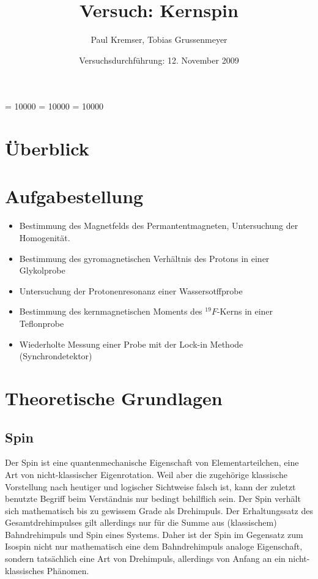 \documentclass[12pt]{article}
\newcommand{\changefont}[3]{
\fontfamily{#1} \fontseries{#2} \fontshape{#3} \selectfont}
\begin{document}
\clubpenalty = 10000
\widowpenalty = 10000 
\displaywidowpenalty = 10000

\onehalfspacing
\changefont{ptm}{m}{n} 

\begin{titlepage}
\author{Paul Kremser, Tobias Grussenmeyer}
\title{Versuch: Kernspin}
\date{Versuchsdurchführung: 12. November 2009} 
\maketitle
\thispagestyle{empty}
\end{titlepage}


\tableofcontents
\thispagestyle{empty}
\newpage
{}
\section{Überblick}

\section{Aufgabestellung}
\begin{itemize}
 \item Bestimmung des Magnetfelds des Permantentmagneten, Untersuchung der Homogenität.
 \item Bestimmung des gyromagnetischen Verhältnis des Protons in einer Glykolprobe
 \item Untersuchung der Protonenresonanz einer Wassersotffprobe
 \item Bestimmung des kernmagnetischen Moments des $^{19}F$-Kerns in einer Teflonprobe
 \item Wiederholte Messung einer Probe mit der Lock-in Methode (Synchrondetektor)
\end{itemize}


\section{Theoretische Grundlagen}

\subsection{Spin}
Der Spin ist eine quantenmechanische Eigenschaft von Elementarteilchen, eine Art von nicht-klassischer Eigenrotation. Weil aber die zugehörige klassische Vorstellung nach heutiger und logischer Sichtweise falsch ist, kann der zuletzt benutzte Begriff beim Verständnis nur bedingt behilflich sein. Der Spin verhält sich mathematisch bis zu gewissem Grade als Drehimpuls. Der Erhaltungssatz des Gesamtdrehimpulses gilt allerdings nur für die Summe aus (klassischem) Bahndrehimpuls und Spin eines Systems. Daher ist der Spin im Gegensatz zum Isospin nicht nur mathematisch eine dem Bahndrehimpuls analoge Eigenschaft, sondern tatsächlich eine Art von Drehimpuls, allerdings von Anfang an ein nicht-klassisches Phänomen.\\
\end{document}
